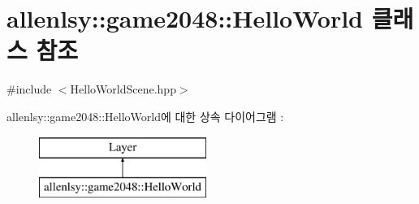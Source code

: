 \hypertarget{classallenlsy_1_1game2048_1_1_hello_world}{}\section{allenlsy\+:\+:game2048\+:\+:Hello\+World 클래스 참조}
\label{classallenlsy_1_1game2048_1_1_hello_world}


{\ttfamily \#include $<$Hello\+World\+Scene.\+hpp$>$}

allenlsy\+:\+:game2048\+:\+:Hello\+World에 대한 상속 다이어그램 \+: \begin{figure}[H]
\begin{center}
\leavevmode
\includegraphics[height=2.000000cm]{classallenlsy_1_1game2048_1_1_hello_world}
\end{center}
\end{figure}
